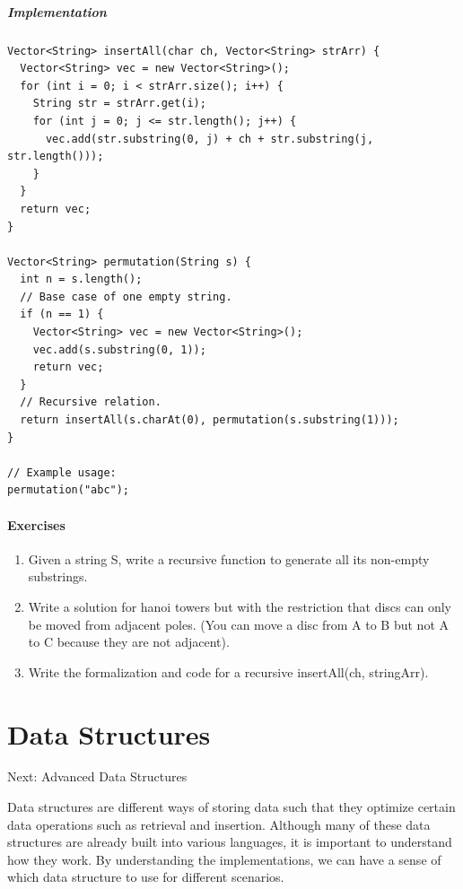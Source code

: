 \documentclass[11pt,oneside]{book}
\begin{document}
\subsubsection{Implementation}

\begin{lstlisting}
Vector<String> insertAll(char ch, Vector<String> strArr) {
  Vector<String> vec = new Vector<String>();
  for (int i = 0; i < strArr.size(); i++) {
    String str = strArr.get(i);
    for (int j = 0; j <= str.length(); j++) {
      vec.add(str.substring(0, j) + ch + str.substring(j, str.length()));
    }
  }
  return vec;
}

Vector<String> permutation(String s) {
  int n = s.length();
  // Base case of one empty string.
  if (n == 1) {
    Vector<String> vec = new Vector<String>();
    vec.add(s.substring(0, 1));
    return vec;
  }
  // Recursive relation.
  return insertAll(s.charAt(0), permutation(s.substring(1)));
}

// Example usage:
permutation("abc");
\end{lstlisting}

\subsection{Exercises}

\begin{enumerate}
\item Given a string S, write a recursive function to generate all its non-empty substrings.
\item Write a solution for hanoi towers but with the restriction that discs can only be moved from adjacent poles. (You can move a disc from A to B but not A to C because they are not adjacent).
\item Write the formalization and code for a recursive insertAll(ch, stringArr).
\end{enumerate}

\part{ Data Structures }
    

Next: Advanced Data Structures

Data structures are different ways of storing data such that they optimize certain data operations such as retrieval and insertion. Although many of these data structures are already built into various languages, it is important to understand how they work. By understanding the implementations, we can have a sense of which data structure to use for different scenarios.
\end{document}
